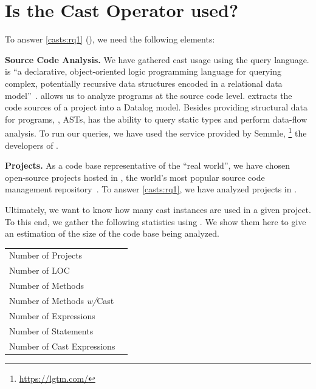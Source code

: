 \section{Is the Cast Operator used?}
\label{sec:casts:stats}



To answer \ref{casts:rq1} (\emph{\crqA}),
%
%
we need the following elements:

\textbf{Source Code Analysis.}
We have gathered cast usage using the \ql{} query language.
\ql{} is ``a declarative, object-oriented logic programming language for querying complex, potentially recursive data structures encoded in a relational data model''~\citep{avgustinovQLObjectorientedQueries2016}.
\ql{} allows us to analyze programs at the source code level.
\ql{} extracts the code sources of a project into a Datalog model.
Besides providing structural data for programs, \ie{}, ASTs,
\ql{} has the ability to query static types and perform data-flow analysis.
To run our \ql{} queries,
we have used the service provided by Semmle,%
\footnote{\url{https://lgtm.com/}} 
%
%
the developers of \ql{}.

\textbf{Projects.} 
As a code base representative of the ``real world'',
we have chosen open-source projects hosted in \github{},
the world's most popular source code
%
%
management repository~\citep{gousiosLeanGHTorrentGitHub2014}.
To answer \ref{casts:rq1},
%
%
we have analyzed \nproject{} \java{} projects in \lgtm{}.

Ultimately, we want to know how many cast instances are used in a given project.
To this end, we gather the following statistics using \ql{}.
We show them here to give an estimation of the size of the code base being analyzed.

\begin{center}
\begin{tabular}{lr}
	\hline
	Number of Projects 				& \nproject \\
	Number of LOC 					& \nloc{} \\
	Number of Methods 				& \nmethod \\
	Number of Methods \emph{w/}Cast	& \nmethodwithcast \\
    Number of Expressions			& \nexpr \\
    Number of Statements			& \nstmt \\
    Number of Cast Expressions		& \ncast \\
	\hline
\end{tabular}
\end{center}

